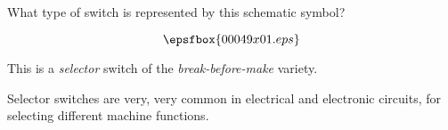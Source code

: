 

What type of switch is represented by this schematic symbol?

$$\epsfbox{00049x01.eps}$$







This is a {\it selector} switch of the {\it break-before-make} variety.







Selector switches are very, very common in electrical and electronic circuits, for selecting different machine functions.




